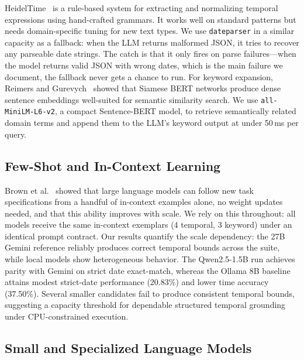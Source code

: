 \documentclass[conference]{IEEEtran}
\begin{document}
HeidelTime~\cite{strotgen2010heideltime} is a rule-based system for extracting and normalizing temporal expressions using hand-crafted grammars. It works well on standard patterns but needs domain-specific tuning for new text types. We use \texttt{dateparser} in a similar capacity as a fallback: when the LLM returns malformed JSON, it tries to recover any parseable date strings. The catch is that it only fires on parse failures---when the model returns valid JSON with wrong dates, which is the main failure we document, the fallback never gets a chance to run. For keyword expansion, Reimers and Gurevych~\cite{reimers2019sentencebert} showed that Siamese BERT networks produce dense sentence embeddings well-suited for semantic similarity search. We use \texttt{all-MiniLM-L6-v2}, a compact Sentence-BERT model, to retrieve semantically related domain terms and append them to the LLM's keyword output at under 50\,ms per query.

\subsection{Few-Shot and In-Context Learning}

Brown et al.~\cite{brown2020language} showed that large language models can follow new task specifications from a handful of in-context examples alone, no weight updates needed, and that this ability improves with scale. We rely on this throughout: all models receive the same in-context exemplars (4 temporal, 3 keyword) under an identical prompt contract. Our results quantify the scale dependency: the 27B Gemini reference reliably produces correct temporal bounds across the suite, while local models show heterogeneous behavior. The Qwen2.5-1.5B run achieves parity with Gemini on strict date exact-match, whereas the Ollama 8B baseline attains modest strict-date performance (20.83\%) and lower time accuracy (37.50\%). Several smaller candidates fail to produce consistent temporal bounds, suggesting a capacity threshold for dependable structured temporal grounding under CPU-constrained execution.

\subsection{Small and Specialized Language Models}
\end{document}
